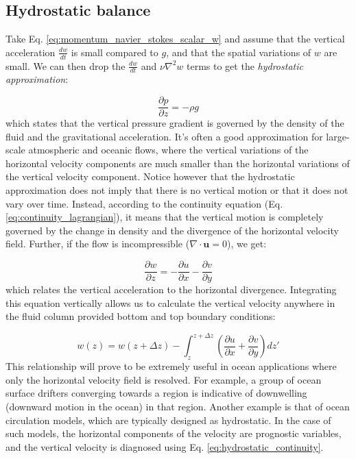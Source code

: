 \documentclass[12pt]{article}
\numberwithin{equation}{section}
\numberwithin{figure}{section}
\numberwithin{table}{section}
\begin{document}
\subsection{Hydrostatic balance}

Take Eq. \ref{eq:momentum_navier_stokes_scalar_w} and assume that the vertical
acceleration $\frac{dw}{dt}$ is small compared to $g$, and that the spatial
variations of $w$ are small.
We can then drop the $\frac{dw}{dt}$ and $\nu \nabla^2 w$ terms to get the
\textit{hydrostatic approximation}:

\begin{equation}
  \frac{\partial p}{\partial z} = - \rho g
  \label{eq:hydrostatic_approximation}
\end{equation}
which states that the vertical pressure gradient is governed by the density
of the fluid and the gravitational acceleration.
It's often a good approximation for large-scale atmospheric and oceanic flows,
where the vertical variations of the horizontal velocity components are much
smaller than the horizontal variations of the vertical velocity component.
Notice however that the hydrostatic approximation does not imply that there
is no vertical motion or that it does not vary over time.
Instead, according to the continuity equation (Eq. \ref{eq:continuity_lagrangian}),
it means that the vertical motion is completely governed by the change in
density and the divergence of the horizontal velocity field.
Further, if the flow is incompressible ($\nabla \cdot \mathbf{u} = 0$),
we get:

\begin{equation}
  \frac{\partial w}{\partial z} = - \frac{\partial u}{\partial x} - \frac{\partial v}{\partial y}
  \label{eq:hydrostatic_continuity}
\end{equation}
which relates the vertical acceleration to the horizontal divergence.
Integrating this equation vertically allows us to calculate the vertical velocity
anywhere in the fluid column provided bottom and top boundary conditions:

\begin{equation}
  w\left(z\right) = w\left(z+\Delta z\right) - \int_z^{z+\Delta z} \left(\frac{\partial u}{\partial x} + \frac{\partial v}{\partial y} \right) dz'
\end{equation}
This relationship will prove to be extremely useful in ocean applications where
only the horizontal velocity field is resolved.
For example, a group of ocean surface drifters converging towards a region is
indicative of downwelling (downward motion in the ocean) in that region.
Another example is that of ocean circulation models, which are typically
designed as hydrostatic.
In the case of such models, the horizontal components of the velocity are
prognostic variables, and the vertical velocity is diagnosed using
Eq. \ref{eq:hydrostatic_continuity}.
\end{document}
